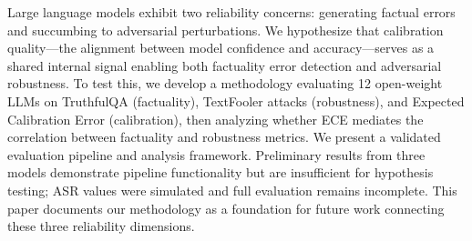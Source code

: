 Large language models exhibit two reliability concerns: generating factual errors and succumbing to adversarial perturbations. We hypothesize that calibration quality---the alignment between model confidence and accuracy---serves as a shared internal signal enabling both factuality error detection and adversarial robustness. To test this, we develop a methodology evaluating 12 open-weight LLMs on TruthfulQA (factuality), TextFooler attacks (robustness), and Expected Calibration Error (calibration), then analyzing whether ECE mediates the correlation between factuality and robustness metrics. We present a validated evaluation pipeline and analysis framework. Preliminary results from three models demonstrate pipeline functionality but are insufficient for hypothesis testing; ASR values were simulated and full evaluation remains incomplete. This paper documents our methodology as a foundation for future work connecting these three reliability dimensions.
